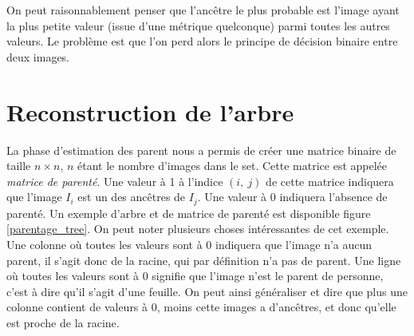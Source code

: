 \documentclass[utf8,final]{stageM2R} %
\begin{document}
On peut raisonnablement penser que l'ancêtre le plus probable est l'image ayant la plus petite valeur (issue d'une métrique quelconque) parmi toutes les autres valeurs. Le problème est que l'on perd alors le principe de décision binaire entre deux images.

\section{Reconstruction de l'arbre}
La phase d'estimation des parent nous a permis de créer une matrice binaire de taille $n\times n$, $n$ étant le nombre d'images dans le set. Cette matrice est appelée \textit{matrice de parenté}. Une valeur à 1 à l'indice $(i,\ j)$ de cette matrice indiquera que l'image $I_i$ est un des ancêtres de $I_j$. Une valeur à 0 indiquera l'absence de parenté. Un exemple d'arbre et de matrice de parenté est disponible figure \ref{parentage_tree}. On peut noter plusieurs choses intéressantes de cet exemple. Une colonne où toutes les valeurs sont à 0 indiquera que l'image n'a aucun parent, il s'agit donc de la racine, qui par définition n'a pas de parent. Une ligne où toutes les valeurs sont à 0 signifie que l'image n'est le parent de personne, c'est à dire qu'il s'agit d'une feuille. On peut ainsi généraliser et dire que plus une colonne contient de valeurs à 0, moins cette images a d'ancêtres, et donc qu'elle est proche de la racine.
\end{document}
